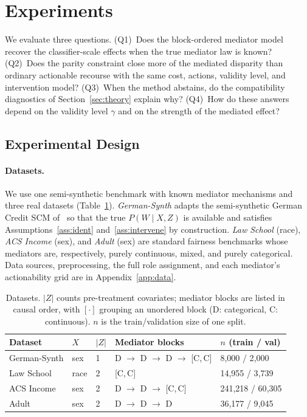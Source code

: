 \section{Experiments}
\label{sec:experiments}

We evaluate three questions.
(Q1)~Does the block-ordered mediator model recover the classifier-scale
effects when the true mediator law is known?
(Q2)~Does the parity constraint close more of the mediated disparity than
ordinary actionable recourse with the same cost, actions, validity level, and
intervention model?
(Q3)~When the method abstains, do the compatibility diagnostics of
Section~\ref{sec:theory} explain why?
(Q4)~How do these answers depend on the validity level $\gamma$ and on the
strength of the mediated effect?

\subsection{Experimental Design}
\label{sec:exp_design}

\paragraph{Datasets.}
We use one semi-synthetic benchmark with known mediator mechanisms and three
real datasets (Table~\ref{tab:datasets}).
\emph{German-Synth} adapts the semi-synthetic German Credit SCM
of~\citet{karimi2020imperfect} so that the true $P(W\mid X,Z)$ is available
and satisfies Assumptions~\ref{ass:ident} and~\ref{ass:intervene} by
construction.
\emph{Law School} (race), \emph{ACS Income} (sex), and \emph{Adult} (sex)
are standard fairness benchmarks whose mediators are, respectively, purely
continuous, mixed, and purely categorical. Data sources, preprocessing, the
full role assignment, and each mediator's actionability grid are in
Appendix~\ref{app:data}.

\begin{table}[t]
\centering
\small
\caption{Datasets. $|Z|$ counts pre-treatment covariates; mediator blocks are
listed in causal order, with $[\cdot]$ grouping an unordered block
(D: categorical, C: continuous). $n$ is the train/validation size of one
split.}
\label{tab:datasets}
\begin{tabular}{lllll}
\hline
Dataset & $X$ & $|Z|$ & Mediator blocks & $n$ (train / val) \\
\hline
German-Synth & sex  & 1 & D $\to$ D $\to$ D $\to$ [C,\,C] & 8{,}000 / 2{,}000 \\
Law School   & race & 2 & [C,\,C]                         & 14{,}955 / 3{,}739 \\
ACS Income   & sex  & 2 & D $\to$ D $\to$ [C,\,C]         & 241{,}218 / 60{,}305 \\
Adult        & sex  & 2 & D $\to$ D $\to$ D               & 36{,}177 / 9{,}045 \\
\hline
\end{tabular}
\end{table}

